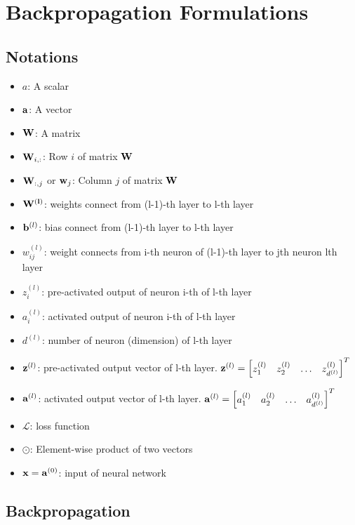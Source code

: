 \documentclass[14pt, a4paper]{article}
\numberwithin{equation}{section}
\numberwithin{algorithm}{section}
\numberwithin{figure}{section}
\begin{document}
\section{Backpropagation Formulations}

\subsection{Notations}
\begin{itemize}
  \item $a$: A scalar
    \item $\bold{a}$: A vector
    \item $\bold{W}$: A matrix
     \item $\bold{W}_{i,:}$: Row $i$ of matrix $\bold{W}$
      \item $\bold{W}_{:,j}$ or $\bold{w}_j$: Column $j$ of matrix $\bold{W}$
       \item $\bold{W^{(l)}}$: weights connect from (l-1)-th layer to l-th layer
      \item $\bold{b}^{(l)}$: bias connect from (l-1)-th layer to l-th layer
      \item $w_{ij}^{(l)}$: weight connects from i-th neuron of (l-1)-th layer to jth neuron lth layer
      \item $z_{i}^{(l)}$: pre-activated output of neuron i-th of l-th layer
      \item $a_{i}^{(l)}$: activated output of neuron i-th of l-th layer
      \item $d^{(l)}$: number of neuron (dimension) of l-th layer
      \item $\bold{z}^{(l)}$: pre-activated output vector of l-th layer. $\bold{z}^{(l)} = \begin{bmatrix} z_1^{(l)} & z_2^{(l)} & \dots & z_{d^{(l)}}^{(l)}\end{bmatrix}^T$
      \item $\bold{a}^{(l)}$: activated output vector of l-th layer. $\bold{a}^{(l)} = \begin{bmatrix} a_1^{(l)} & a_2^{(l)} &\dots & a_{d^{(l)}}^{(l)}\end{bmatrix}^T$
      \item $\mathcal{L}$: loss function
      \item $\odot$: Element-wise product of two vectors
      \item $\bold{x}=\bold{a}^{(0)}$: input of neural network
\end{itemize}

\subsection{Backpropagation}
\end{document}
